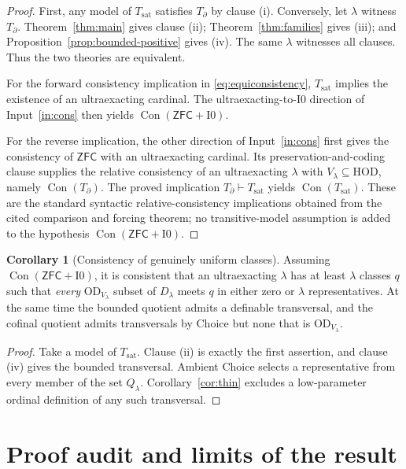 \documentclass[11pt,letterpaper]{article}
\theoremstyle{definition}
\newtheorem{corollary}[definition]{Corollary}
\newcommand{\ZFC}{\mathsf{ZFC}}
\newcommand{\HOD}{\mathrm{HOD}}
\newcommand{\OD}{\mathrm{OD}}
\newcommand{\Con}{\operatorname{Con}}
\newcommand{\Izero}{\mathrm{I0}}
\numberwithin{equation}{section}
\newcommand{\Tbase}{T_{\partial}}
\newcommand{\Tsat}{T_{\mathrm{sat}}}
\begin{document}
\begin{proof}
First, any model of $\Tsat$ satisfies $\Tbase$ by clause (i). Conversely,
let $\lambda$ witness $\Tbase$. Theorem~\ref{thm:main} gives
clause (ii); Theorem~\ref{thm:families} gives (iii); and
Proposition~\ref{prop:bounded-positive} gives (iv). The same $\lambda$
witnesses all clauses. Thus the two theories are equivalent.

For the forward consistency implication in \eqref{eq:equiconsistency},
$\Tsat$ implies the existence of an ultraexacting cardinal. The
ultraexacting-to-$\Izero$ direction of Input~\ref{in:cons} then yields
$\Con(\ZFC+\Izero)$.

For the reverse implication, the other direction of Input~\ref{in:cons}
first gives the consistency of $\ZFC$ with an ultraexacting cardinal.
Its preservation-and-coding clause supplies the relative consistency of
an ultraexacting $\lambda$ with $V_\lambda\subseteq\HOD$, namely
$\Con(\Tbase)$. The proved implication $\Tbase\vdash\Tsat$ yields
$\Con(\Tsat)$. These are the standard syntactic relative-consistency
implications obtained from the cited comparison and forcing theorem; no
transitive-model assumption is added to the hypothesis $\Con(\ZFC+\Izero)$.
\end{proof}

\begin{corollary}[Consistency of genuinely uniform classes]\label{cor:all-low-consistent}
Assuming $\Con(\ZFC+\Izero)$, it is consistent that an ultraexacting
$\lambda$ has at least $\lambda$ classes $q$ such that \emph{every}
$\OD_{V_\lambda}$ subset of $D_\lambda$ meets $q$ in either zero or $\lambda$
representatives. At the same time the bounded quotient admits a definable
transversal, and the cofinal quotient admits transversals by Choice but
none that is $\OD_{V_\lambda}$.
\end{corollary}

\begin{proof}
Take a model of $\Tsat$. Clause (ii) is exactly the first assertion, and
clause (iv) gives the bounded transversal. Ambient Choice selects a
representative from every member of the set $Q_\lambda$.
Corollary~\ref{cor:thin} excludes a low-parameter ordinal definition of
any such transversal.
\end{proof}

\section{Proof audit and limits of the result}\label{sec:audit}
\end{document}
